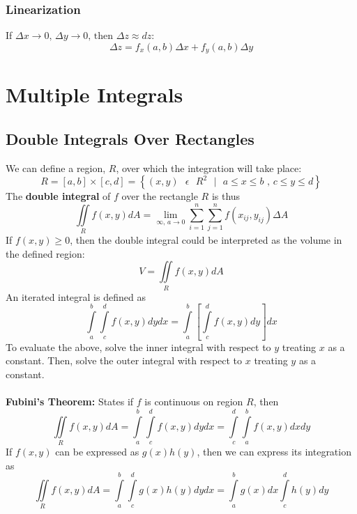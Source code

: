 \documentclass[11pt]{article}
\begin{document}
\subsubsection{Linearization}
If $\Delta x  \rightarrow 0 \text{, } \Delta y \rightarrow 0 \text{, then } \Delta z \approx dz:$
$$ \Delta z = f_x(a,b)\Delta x + f_y(a,b)\Delta y$$

\pagebreak

\section{Multiple Integrals}

\subsection{Double Integrals Over Rectangles}

We can define a region, $R$, over which the integration will take place:
$$R = [a, b] \times [c,d] = \left \lbrace(x,y) \text{ } \epsilon \text{ } R^2 \text{ } |\text{ }  a\leq x \leq b \text{ , } c \leq y \leq d\right \rbrace $$
The \textbf{double integral} of $f$ over the rectangle $R$ is thus
$$\iint\limits_{R} f(x,y)dA = \lim_{\infty \text{, } a \to 0} \sum_{i=1}^{n} \sum_{j=1}^{n} f(x_{ij}, y_{ij}) \Delta A$$
If $f(x,y) \geq 0$, then the double integral could be interpreted as the volume in the defined region:
$$ V = \iint\limits_{R} f(x,y)dA$$
An iterated integral is defined as 
$$\int\limits_{a}^{b} \int\limits_{c}^{d} f(x,y)dydx = \int\limits_{a}^{b}\left[ \int\limits_{c}^{d} f(x,y)dy\right]dx$$
To evaluate the above, solve the inner integral with respect to $y$ treating $x$ as a constant. Then, solve the outer integral with respect to $x$ treating $y$ as a constant.
\\
\\
\textbf{Fubini's Theorem:} States if $f$ is continuous on region $R$, then 
$$\iint\limits_{R} f(x,y)dA = \int\limits_{a}^{b} \int\limits_{c}^{d} f(x,y)dydx = \int\limits_{c}^{d} \int\limits_{a}^{b} f(x,y)dxdy$$
If $f(x,y)$ can be expressed as $g(x)h(y)$, then we can express its integration as 
$$\iint\limits_{R} f(x,y)dA = \int\limits_{a}^{b} \int\limits_{c}^{d} g(x)h(y)dydx = \int\limits_{a}^{b} g(x)dx \int\limits_{c}^{d} h(y)dy$$
\end{document}

